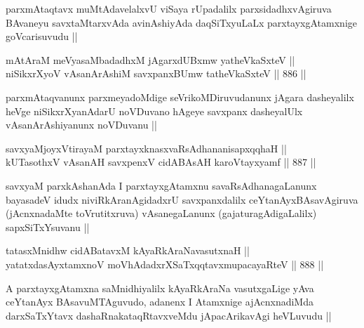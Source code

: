 \begin{artha}
parxmAtaqtavx muMtAdavelalxvU viSaya rUpadalilx parxsidadhxvAgiruva BAvaneyu savxtaMtarxvAda avinAshiyAda daqSiTxyuLaLx parxtayxgAtamxnige goVcarisuvudu ||
\end{artha}


\begin{shl}
mAtAraM meVyasaMbadadhxM jAgarxdUBxmw yatheVkaSxteV || \\
niSikxrXyoV vAsanArAshiM savxpanxBUmw tatheVkaSxteV ||  886 ||  
\end{shl}

\begin{artha}
parxmAtaqvanunx parxmeyadoMdige seVrikoMDiruvudanunx jAgara dasheyalilx heVge niSikxrXyanAdarU noVDuvano hAgeye savxpanx dasheyalUlx vAsanArAshiyanunx noVDuvanu ||
\end{artha}


\begin{shl}
savxyaMjoyxVtirayaM parxtayxknasxvaRsAdhananisapxqqhaH || \\
kUTasothxV vAsanAH savxpenxV cidABAsAH karoVtayxyamf ||  887 ||  
\end{shl}

\begin{artha}
savxyaM parxkAshanAda I parxtayxgAtamxnu savaRsAdhanagaLanunx bayasadeV idudx niviRkAranAgidadxrU savxpanxdalilx ceYtanAyxBAsavAgiruva (jAcnxnadaMte toVrutitxruva) vAsanegaLanunx (gajaturagAdigaLalilx) sapxSiTxYsuvanu ||
\end{artha}


\begin{shl}
tatasxMnidhw cidABatavxM kAyaRkAraNavasutxnaH ||  \\
yatatxdasAyx\s \s tamxnoV moVhAdadxrXSaTxqqtavxmupacayaRteV ||  888 ||  
\end{shl}

\begin{artha}
A parxtayxgAtamxna saMnidhiyalilx kAyaRkAraNa vasutxgaLige yAva ceYtanAyx BAsavuMTAguvudo, adanenx I Atamxnige ajAcnxnadiMda darxSaTxYtavx dashaRnakataqRtavxveMdu jApacArikavAgi heVLuvudu ||
\end{artha}

